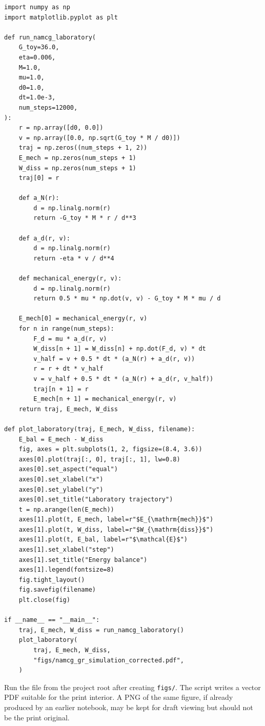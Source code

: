 \begin{lstlisting}[style=namcgPythonStyle, caption={Python implementation of the reduced inspiral laboratory velocity-Verlet integrator.}, label={lst:inspiral_code}]
import numpy as np
import matplotlib.pyplot as plt

def run_namcg_laboratory(
    G_toy=36.0,
    eta=0.006,
    M=1.0,
    mu=1.0,
    d0=1.0,
    dt=1.0e-3,
    num_steps=12000,
):
    r = np.array([d0, 0.0])
    v = np.array([0.0, np.sqrt(G_toy * M / d0)])
    traj = np.zeros((num_steps + 1, 2))
    E_mech = np.zeros(num_steps + 1)
    W_diss = np.zeros(num_steps + 1)
    traj[0] = r

    def a_N(r):
        d = np.linalg.norm(r)
        return -G_toy * M * r / d**3

    def a_d(r, v):
        d = np.linalg.norm(r)
        return -eta * v / d**4

    def mechanical_energy(r, v):
        d = np.linalg.norm(r)
        return 0.5 * mu * np.dot(v, v) - G_toy * M * mu / d

    E_mech[0] = mechanical_energy(r, v)
    for n in range(num_steps):
        F_d = mu * a_d(r, v)
        W_diss[n + 1] = W_diss[n] + np.dot(F_d, v) * dt
        v_half = v + 0.5 * dt * (a_N(r) + a_d(r, v))
        r = r + dt * v_half
        v = v_half + 0.5 * dt * (a_N(r) + a_d(r, v_half))
        traj[n + 1] = r
        E_mech[n + 1] = mechanical_energy(r, v)
    return traj, E_mech, W_diss

def plot_laboratory(traj, E_mech, W_diss, filename):
    E_bal = E_mech - W_diss
    fig, axes = plt.subplots(1, 2, figsize=(8.4, 3.6))
    axes[0].plot(traj[:, 0], traj[:, 1], lw=0.8)
    axes[0].set_aspect("equal")
    axes[0].set_xlabel("x")
    axes[0].set_ylabel("y")
    axes[0].set_title("Laboratory trajectory")
    t = np.arange(len(E_mech))
    axes[1].plot(t, E_mech, label=r"$E_{\mathrm{mech}}$")
    axes[1].plot(t, W_diss, label=r"$W_{\mathrm{diss}}$")
    axes[1].plot(t, E_bal, label=r"$\mathcal{E}$")
    axes[1].set_xlabel("step")
    axes[1].set_title("Energy balance")
    axes[1].legend(fontsize=8)
    fig.tight_layout()
    fig.savefig(filename)
    plt.close(fig)

if __name__ == "__main__":
    traj, E_mech, W_diss = run_namcg_laboratory()
    plot_laboratory(
        traj, E_mech, W_diss,
        "figs/namcg_gr_simulation_corrected.pdf",
    )
\end{lstlisting}

Run the file from the project root after creating \texttt{figs/}.
The script writes a vector PDF suitable for the print interior.
A PNG of the same figure, if already produced by an earlier
notebook, may be kept for draft viewing but should not be the
print original.

